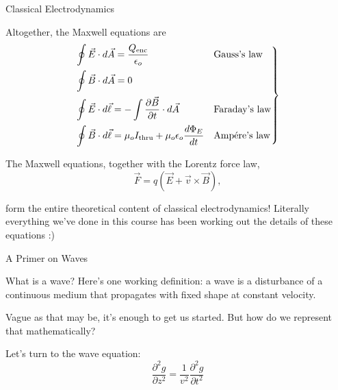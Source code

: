 \documentclass{beamer}
\begin{document}
\begin{frame}{Classical Electrodynamics}

Altogether, the Maxwell equations are
\begin{equation*}
    \begin{rcases} \displaystyle \oint \vec{E} \cdot d\vec{A} = \frac{Q_{\text{enc}}}{\epsilon_o} & \text{Gauss's law} \\[0.1em] \displaystyle \oint \vec{B} \cdot d\vec{A} = 0 & \text{} \\[0.1em] \displaystyle \oint \vec{E} \cdot d\vec{\ell} = - \int \frac{\partial \vec{B}}{\partial t} \cdot d\vec{A} & \text{Faraday's law} \\[0.1em] \displaystyle \oint \vec{B} \cdot d\vec{\ell} = \mu_o I_{\text{thru}} + \mu_o \epsilon_o \frac{d\Phi_E}{dt} & \text{Amp{\'e}re's law} \end{rcases}
\end{equation*}

The Maxwell equations, together with the Lorentz force law,
\begin{equation*}
    \vec{F} = q \left( \vec{E} + \vec{v} \times \vec{B} \right),
\end{equation*}

form the entire theoretical content of classical electrodynamics! Literally everything we've done in this course has been working out the details of these equations :)

\end{frame}

\begin{frame}{A Primer on Waves}

What is a wave? Here's one working definition: a wave is a disturbance of a continuous medium that propagates with fixed shape at constant velocity.

\vfill

Vague as that may be, it's enough to get us started. But how do we represent that mathematically?

\vfill

Let's turn to the wave equation:
\begin{equation*}
    \frac{\partial^2 g}{\partial z^2} = \frac{1}{v^2} \frac{\partial^2 g}{\partial t^2}
\end{equation*}

\end{frame}
\end{document}

